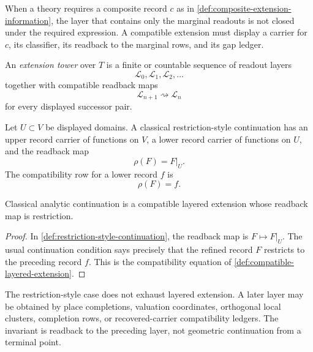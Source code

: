 \begin{principle}
\label{prin:composite-coordinates-force-layer}
When a theory requires a composite record $c$ as in
\autoref{def:composite-extension-information}, the layer that contains
only the marginal readouts is not closed under the required expression.
A compatible extension must display a carrier for $c$, its classifier,
its readback to the marginal rows, and its gap ledger.
\end{principle}

\begin{definition}
\label{def:layered-extension-tower}
An \emph{extension tower} over $T$ is a finite or countable sequence of
readout layers
$$
\mathcal L_0,\mathcal L_1,\mathcal L_2,\ldots
$$
together with compatible readback maps
$$
\mathcal L_{n+1}\rightsquigarrow\mathcal L_n
$$
for every displayed successor pair.
\end{definition}

\begin{definition}
\label{def:restriction-style-continuation}
Let $U\subset V$ be displayed domains. A classical restriction-style
continuation has an upper record carrier of functions on $V$, a lower
record carrier of functions on $U$, and the readback map
$$
\rho(F)=F|_U.
$$
The compatibility row for a lower record $f$ is
$$
\rho(F)=f.
$$
\end{definition}

\begin{theorem}
\label{thm:classical-analytic-continuation-special-case}
Classical analytic continuation is a compatible layered extension whose
readback map is restriction.
\end{theorem}

\begin{proof}
In \autoref{def:restriction-style-continuation}, the readback map is
$F\mapsto F|_U$. The usual continuation condition says precisely that
the refined record $F$ restricts to the preceding record $f$. This is the
compatibility equation of
\autoref{def:compatible-layered-extension}.
\end{proof}

\begin{principle}
\label{prin:continuation-not-linear-endpoint-extension}
The restriction-style case does not exhaust layered extension. A later
layer may be obtained by place completions, valuation coordinates,
orthogonal local clusters, completion rows, or recovered-carrier
compatibility ledgers. The invariant is readback to the preceding layer,
not geometric continuation from a terminal point.
\end{principle}


